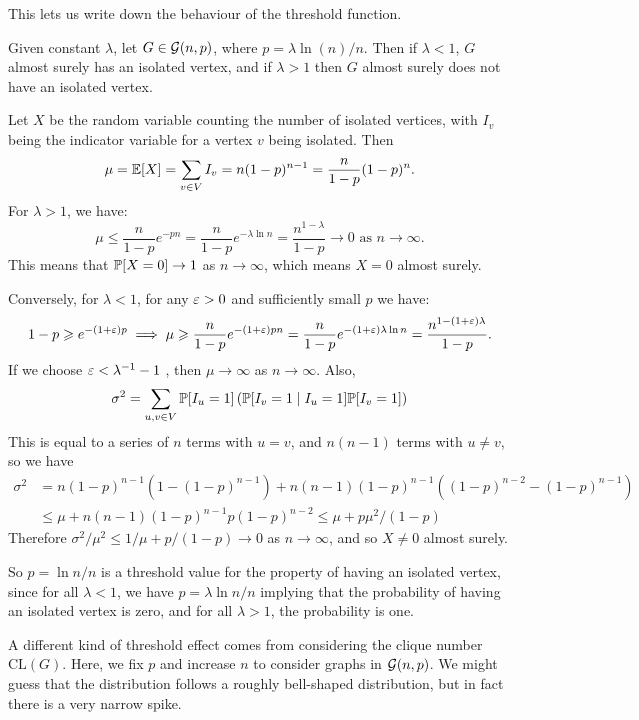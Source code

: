 \documentclass{article}
\begin{document}
This lets us write down the behaviour of the threshold function.

\begin{theorem}
    Given constant $\lambda$, let $G \in \calG(n, p)$, where $p = \lambda \ln(n) / n$. Then if $\lambda < 1$, $G$ almost surely has an isolated vertex, and if $\lambda > 1$ then $G$ almost surely does not have an isolated vertex.
\end{theorem}

\begin{prf}
    Let $X$ be the random variable counting the number of isolated vertices, with $I_v$ being the indicator variable for a vertex $v$ being isolated. Then
    \[
	\mu = \E[X] = \sum_{v \in V} I_v = n(1-p)^{n-1} = \frac{n}{1-p} (1-p)^n.
	\]
	For $\lambda > 1$, we have:
	\[
	\mu \leq \frac{n}{1-p} e^{-pn} = \frac{n}{1-p} e^{-\lambda \ln n} = \frac{n^{1-\lambda}}{1-p} \to 0 \text{ as $n \to \infty$.}
	\]
	This means that $\P[X = 0] \to 1$ as $n \to \infty$, which means $X = 0$ almost surely.
	
	Conversely, for $\lambda < 1$, for any $\eps>0$ and sufficiently small $p$ we have:
	\[
	1 - p \geq e^{-(1 + \eps)p} \implies \mu \geq \frac{n}{1-p} e^{-(1+\eps)pn} = \frac{n}{1-p} e^{-(1+\eps)\lambda \ln n} = \frac{n^{1 - (1+\eps)\lambda}}{1-p}.
	\]
	If we choose $\eps < \lambda^{-1} - 1$ , then $\mu \to \infty$ as $n \to \infty$. Also,
	\[
	\sigma^2 = \sum_{u,v \in V} \P[I_u = 1] \left( \P[I_v = 1 \mid I_u = 1] \P[I_v = 1] \right)
	\]
	This is equal to a series of $n$ terms with $u = v$, and $n(n-1)$ terms with $u \neq v$, so we have
	\begin{align*}
    \sigma^2 &= n(1-p)^{n-1} \left( 1 - (1-p)^{n-1} \right) + n(n-1)(1-p)^{n-1} \left( (1-p)^{n-2} - (1-p)^{n-1} \right) \\
    &\leq \mu + n(n-1) (1-p)^{n-1} p (1-p)^{n-2}  \leq \mu + p\mu^2/(1-p)
	\end{align*}
	Therefore $\sigma^2/\mu^2 \leq 1/\mu + p/(1-p) \to 0$ as $n \to \infty$, and so $X \neq 0$ almost surely.
\end{prf}

So $p = \ln n / n$ is a threshold value for the property of having an isolated vertex, since for all $\lambda < 1$, we have $p = \lambda \ln n / n$ implying that the probability of having an isolated vertex is zero, and for all $\lambda > 1$, the probability is one.

A different kind of threshold effect comes from considering the clique number $\mathrm{CL}(G)$. Here, we fix $p$ and increase $n$ to consider graphs in $\calG (n, p)$. We might guess that the distribution follows a roughly bell-shaped distribution, but in fact there is a very narrow spike.
\end{document}
